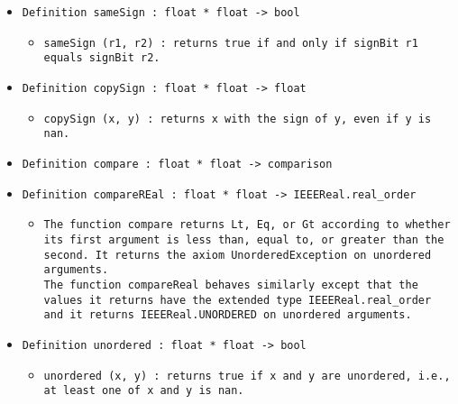 \documentclass[11pt]{report}
\begin{document}
\begin{itemize}
\begin{itemize}
\end{itemize}

\item  \texttt{Definition sameSign : float * float -> bool}

\begin{itemize}
\item \begin{flushleft} \texttt{sameSign (r1, r2) : returns true if and only if signBit r1 equals signBit r2.} \end{flushleft}
\end{itemize}

\item  \texttt{Definition copySign : float * float -> float}

\begin{itemize}
\item   \texttt{copySign (x, y) :  returns x with the sign of y, even if y is nan.}
\end{itemize}

\item  \texttt{Definition compare : float * float -> comparison}

\item  \texttt{Definition compareREal : float * float -> IEEEReal.real\_order}

\begin{itemize}
\item  \begin{flushleft} \texttt{The function compare returns Lt, Eq, or Gt according to whether its first argument is less than, equal to, or greater than the second. It returns the axiom UnorderedException on unordered arguments.\\
\coqdocemptyline
The function compareReal behaves similarly except that the values it returns have the extended type IEEEReal.real\_order and it returns IEEEReal.UNORDERED on unordered arguments.} \end{flushleft}
\end{itemize}

\item  \texttt{Definition unordered : float * float -> bool}

\begin{itemize}
\item  \begin{flushleft} \texttt{unordered (x, y) : returns true if x and y are unordered, i.e., at least one of x and y is nan.} \end{flushleft}
\end{itemize}


\end{itemize}
\end{document}
